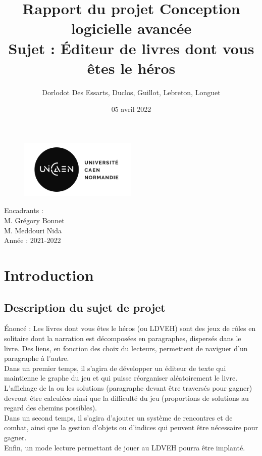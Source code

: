 \documentclass[12pt]{article}
\begin{document}
\begin{titlepage}

\title{Rapport du projet Conception logicielle avancée\\\bigskip
Sujet : Éditeur de livres dont vous êtes le héros}
\author{Dorlodot Des Essarts, Duclos, Guillot, Lebreton, Longuet}
\date{05 avril 2022}
\maketitle
\begin{figure}[htp]
  
  \centering
    \includegraphics[width=0.5\textwidth]{Logo_unicaen}
\end{figure}
\vfill
\vfill
\begin{flushleft}
Encadrants :\\
M. Grégory Bonnet\\
M. Meddouri Nida\\
\bigskip
Année : 2021-2022\\
\end{flushleft}

\hfill
\thispagestyle{empty}
\setcounter{page}{0}
\end{titlepage}

\tableofcontents

\newpage
	
\section{Introduction}
\subsection{Description du sujet de projet}
Énoncé : Les livres dont vous êtes le héros (ou LDVEH) sont des jeux de rôles en solitaire dont la
narration est décomposées en paragraphes, dispersés dans le livre. Des liens, en fonction des choix
du lecteurs, permettent de naviguer d’un paragraphe à l’autre.\medskip
\\
Dans un premier temps, il s’agira de développer un éditeur de texte qui maintienne le graphe du jeu 
et qui puisse réorganiser aléatoirement le livre. L’affichage de la ou les solutions (paragraphe devant être traversés pour
gagner) devront être calculées ainsi que la difficulté du jeu (proportions de solutions au regard des
chemins possibles).\medskip
\\
Dans un second temps, il s’agira d’ajouter un système de rencontres et de combat, ainsi que la gestion d’objets ou d’indices qui peuvent être nécessaire pour gagner. \medskip
\\
Enfin, un mode lecture permettant de jouer au LDVEH pourra être implanté.
\end{document}
